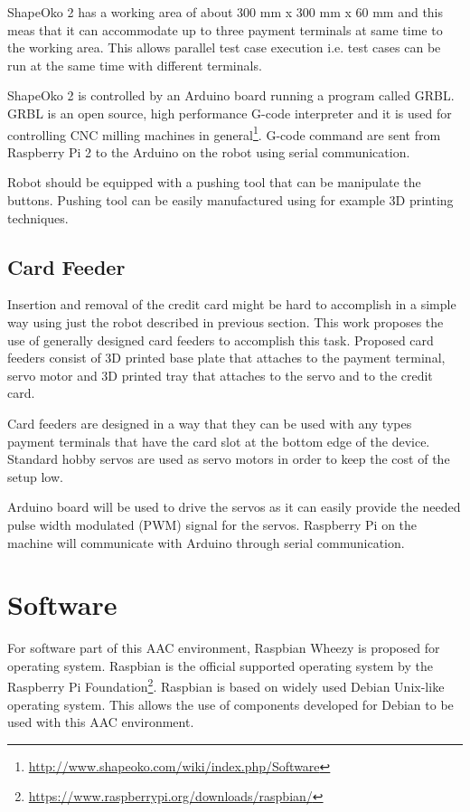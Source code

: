 ShapeOko 2 has a working area of about 300 mm x 300 mm x 60 mm and this meas that it can accommodate up to three payment terminals at same time to the working area. This allows parallel test case execution i.e. test cases can be run at the same time with different terminals.

ShapeOko 2 is controlled by an Arduino board running a program called GRBL. GRBL is an open source, high performance G-code interpreter and it is used for controlling CNC milling machines in general\footnote{\url{http://www.shapeoko.com/wiki/index.php/Software}}. G-code command are sent from Raspberry Pi 2 to the Arduino on the robot using serial communication.

Robot should be equipped with a pushing tool that can be manipulate the buttons. Pushing tool can be easily manufactured using for example 3D printing techniques.

\FloatBarrier
\subsection{Card Feeder}

Insertion and removal of the credit card might be hard to accomplish in a simple way using just the robot described in previous section. This work proposes the use of generally designed card feeders to accomplish this task. Proposed card feeders consist of 3D printed base plate that attaches to the payment terminal, servo motor and 3D printed tray that attaches to the servo and to the credit card.

Card feeders are designed in a way that they can be used with any types payment terminals that have the card slot at the bottom edge of the device. Standard hobby servos are used as servo motors in order to keep the cost of the setup low.

Arduino board will be used to drive the servos as it can easily provide the needed pulse width modulated (PWM) signal for the servos. Raspberry Pi on the machine will communicate with Arduino through serial communication.

\section{Software}

For software part of this AAC environment, Raspbian Wheezy is proposed for operating system. Raspbian is the official supported operating system by the Raspberry Pi Foundation\footnote{\url{https://www.raspberrypi.org/downloads/raspbian/}}. Raspbian is based on widely used Debian Unix-like operating system. This allows the use of components developed for Debian to be used with this AAC environment.

